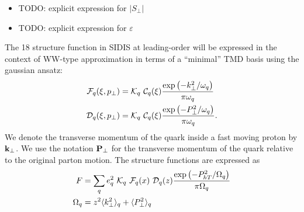 \documentclass[floatfix,aps,prd,nofootinbib,superscriptaddress,preprint]{revtex4}
\newcommand\3[1]{\boldsymbol{#1}}
\newcommand{\bfkperp}{{\bf k}_\perp}
\newcommand{\bfpperp}{{\bf P}_\perp}
\newcommand{\Phperp}{P_{hT}}
\begin{document}
\begin{itemize}
\item {\color{red} TODO: explicit expression for $|S_{\perp}|$}
\item {\color{red} TODO: explicit expression for $\varepsilon$}
\end{itemize}

The 18 structure function in SIDIS at leading-order will be expressed
in the context of WW-type approximation in terms of a ``minimal''
TMD basis using the gaussian ansatz:
%
\begin{align}
{\cal F}_q(\xi,p_{\perp})&={\cal K}_q ~ {\cal C}_q(\xi) \frac{\exp\left(-k_{\perp}^2/\omega_q\right)}{\pi \omega_q}\\
{\cal D}_q(\xi,p_{\perp})&={\cal K}_q ~ {\cal C}_q(\xi) \frac{\exp\left(-P_{\perp}^2/\omega_q\right)}{\pi \omega_q}.
\end{align}
%
We denote the transverse momentum of the quark inside a fast moving
proton by $\bfkperp$. We use the notation $\bfpperp$ for the
transverse momentum of the quark relative to the original parton
motion. The structure functions are expressed as
%
\begin{align}
F&=\sum_q e_q^2 ~ {\cal K}_q ~ {\cal F}_q(x) ~{\cal D}_q(z) \frac{\exp\left(-\Phperp^2/\Omega_q\right)}{\pi \Omega_q}\\
\Omega_q&=z^2\avk + \avp
\end{align}

%
\end{document}
